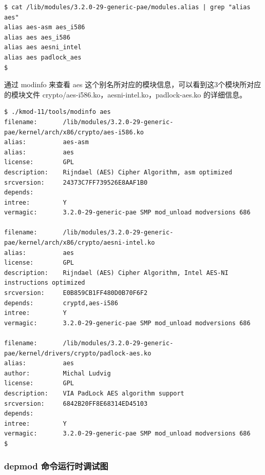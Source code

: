 \documentclass[11pt,a4paper]{article}
\begin{document}
{\begin{shaded}\begin{verbatim}
$ cat /lib/modules/3.2.0-29-generic-pae/modules.alias | grep "alias aes"
alias aes-asm aes_i586
alias aes aes_i586
alias aes aesni_intel
alias aes padlock_aes
$ 
\end{verbatim}\end{shaded}}
通过 modinfo 来查看 aes
这个别名所对应的模块信息，可以看到这3个模块所对应的模块文件
crypto/aes-i586.ko，aesni-intel.ko，padlock-aes.ko 的详细信息。

{\begin{shaded}\begin{verbatim}
$ ./kmod-11/tools/modinfo aes 
filename:       /lib/modules/3.2.0-29-generic-pae/kernel/arch/x86/crypto/aes-i586.ko
alias:          aes-asm
alias:          aes
license:        GPL
description:    Rijndael (AES) Cipher Algorithm, asm optimized
srcversion:     24373C7FF739526E8AAF1B0
depends:        
intree:         Y
vermagic:       3.2.0-29-generic-pae SMP mod_unload modversions 686 

filename:       /lib/modules/3.2.0-29-generic-pae/kernel/arch/x86/crypto/aesni-intel.ko
alias:          aes
license:        GPL
description:    Rijndael (AES) Cipher Algorithm, Intel AES-NI instructions optimized
srcversion:     E0B859CB1FF480D0B70F6F2
depends:        cryptd,aes-i586
intree:         Y
vermagic:       3.2.0-29-generic-pae SMP mod_unload modversions 686 

filename:       /lib/modules/3.2.0-29-generic-pae/kernel/drivers/crypto/padlock-aes.ko
alias:          aes
author:         Michal Ludvig
license:        GPL
description:    VIA PadLock AES algorithm support
srcversion:     6842B20FF8E68314ED45103
depends:        
intree:         Y
vermagic:       3.2.0-29-generic-pae SMP mod_unload modversions 686 
$ 
\end{verbatim}\end{shaded}}
\subsubsection{depmod 命令运行时调试图}
\end{document}
